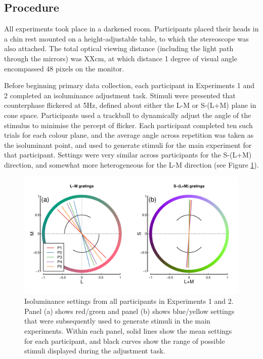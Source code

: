 \documentclass[
]{article}
\begin{document}
\hypertarget{procedure}{%
\subsection{Procedure}\label{procedure}}

All experiments took place in a darkened room. Participants placed their heads in a chin rest mounted on a height-adjustable table, to which the stereoscope was also attached. The total optical viewing distance (including the light path through the mirrors) was XXcm, at which distance 1 degree of visual angle encompassed 48 pixels on the monitor.

Before beginning primary data collection, each participant in Experiments 1 and 2 completed an isoluminance adjustment task. Stimuli were presented that counterphase flickered at 5Hz, defined about either the L-M or S-(L+M) plane in cone space. Participants used a trackball to dynamically adjust the angle of the stimulus to minimise the percept of flicker. Each participant completed ten such trials for each colour plane, and the average angle across repetition was taken as the isoluminant point, and used to generate stimuli for the main experiment for that participant. Settings were very similar across participants for the S-(L+M) direction, and somewhat more heterogeneous for the L-M direction (see Figure \ref{fig:isofig}).

\begin{figure}

{\centering \includegraphics{Figures/isosettings} 

}

\caption{Isoluminance settings from all participants in Experiments 1 and 2. Panel (a) shows red/green and panel (b) shows blue/yellow settings that were subsequently used to generate stimuli in the main experiments. Within each panel, solid lines show the mean settings for each participant, and black curves show the range of possible stimuli displayed during the adjustment task.}\label{fig:isofig}
\end{figure}
\end{document}

